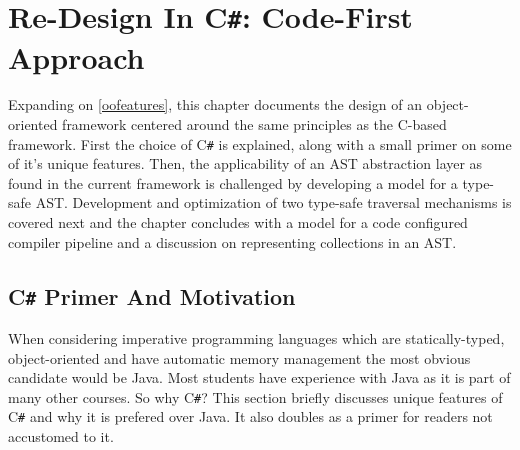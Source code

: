 \documentclass[twoside,openright]{uva-bachelor-thesis}
\newcommand{\cs}{C\texttt{\#}\xspace}
\begin{document}

	
	
\chapter{Re-Design In \cs: Code-First Approach}
	Expanding on \cref{oofeatures}, this chapter documents the design of an object-oriented framework centered around the same principles as the C-based framework. First the choice of \cs is explained, along with a small primer on some of it's unique features. Then, the applicability of an AST abstraction layer as found in the current framework is challenged by developing a model for a type-safe AST. Development and optimization of two type-safe traversal mechanisms is covered next and the chapter concludes with a model for a code configured compiler pipeline and a discussion on representing collections in an AST.
		
		
	\section{\cs Primer And Motivation}
	\label{csprimer}
		When considering imperative programming languages which are statically-typed, object-oriented and have automatic memory management the most obvious candidate would be Java. Most students have experience with Java as it is part of many other courses. So why \cs? This section briefly discusses unique features of \cs and why it is prefered over Java. It also doubles as a primer for readers not accustomed to it.
		
\end{document}
